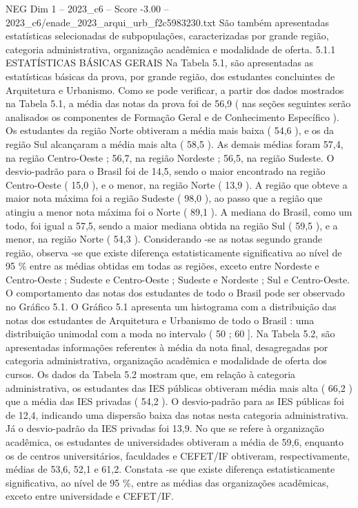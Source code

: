 \begin{textsample}{NEG Dim 1 – 2023\_c6 – Score -3.00 – 2023\_c6/enade\_2023\_arqui\_urb\_f2c5983230.txt}
São também apresentadas estatísticas selecionadas de subpopulações, caracterizadas por grande região, categoria administrativa, organização acadêmica e modalidade de oferta. 5.1.1 ESTATÍSTICAS BÁSICAS GERAIS Na Tabela 5.1, são apresentadas as estatísticas básicas da prova, por grande região, dos estudantes concluintes de Arquitetura e Urbanismo.
Como se pode verificar, a partir dos dados mostrados na Tabela 5.1, a média das notas da prova foi de 56,9 ( nas seções seguintes serão analisados os componentes de Formação Geral e de Conhecimento Específico ).
Os estudantes da região Norte obtiveram a média mais baixa ( 54,6 ), e os da região Sul alcançaram a média mais alta ( 58,5 ).
As demais médias foram 57,4, na região Centro-Oeste ; 56,7, na região Nordeste ; 56,5, na região Sudeste.
O desvio-padrão para o Brasil foi de 14,5, sendo o maior encontrado na região Centro-Oeste ( 15,0 ), e o menor, na região Norte ( 13,9 ).
A região que obteve a maior nota máxima foi a região Sudeste ( 98,0 ), ao passo que a região que atingiu a menor nota máxima foi o Norte ( 89,1 ).
A mediana do Brasil, como um todo, foi igual a 57,5, sendo a maior mediana obtida na região Sul ( 59,5 ), e a menor, na região Norte ( 54,3 ).
Considerando -se as notas segundo grande região, observa -se que existe diferença estatisticamente significativa ao nível de 95 \% entre as médias obtidas em todas as regiões, exceto entre Nordeste e Centro-Oeste ; Sudeste e Centro-Oeste ; Sudeste e Nordeste ; Sul e Centro-Oeste.
O comportamento das notas dos estudantes de todo o Brasil pode ser observado no Gráfico 5.1.
O Gráfico 5.1 apresenta um histograma com a distribuição das notas dos estudantes de Arquitetura e Urbanismo de todo o Brasil : uma distribuição unimodal com a moda no intervalo ( 50 ; 60 ].
Na Tabela 5.2, são apresentadas informações referentes à média da nota final, desagregadas por categoria administrativa, organização acadêmica e modalidade de oferta dos cursos.
Os dados da Tabela 5.2 mostram que, em relação à categoria administrativa, os estudantes das IES públicas obtiveram média mais alta ( 66,2 ) que a média das IES privadas ( 54,2 ).
O desvio-padrão para as IES públicas foi de 12,4, indicando uma dispersão baixa das notas nesta categoria administrativa.
Já o desvio-padrão da IES privadas foi 13,9.
No que se refere à organização acadêmica, os estudantes de universidades obtiveram a média de 59,6, enquanto os de centros universitários, faculdades e CEFET/IF obtiveram, respectivamente, médias de 53,6, 52,1 e 61,2.
Constata -se que existe diferença estatisticamente significativa, ao nível de 95 \%, entre as médias das organizações acadêmicas, exceto entre universidade e CEFET/IF.

\end{textsample}
